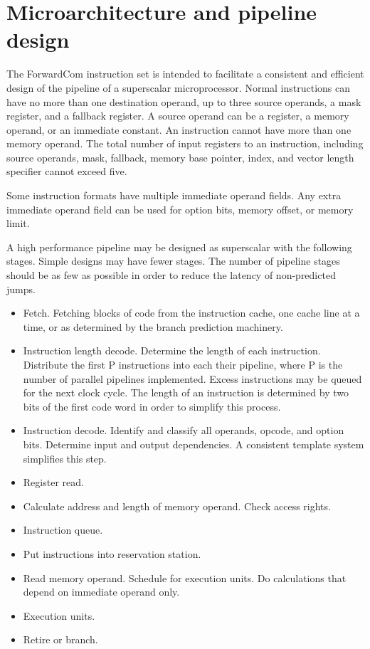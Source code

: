 \documentclass[forwardcom.tex]{subfiles}
\begin{document}
\RaggedRight

\chapter{Microarchitecture and pipeline design}
The ForwardCom instruction set is intended to facilitate a consistent and efficient design of the pipeline of a superscalar microprocessor. Normal instructions can have no more than one destination operand, up to three source operands, a mask register, and a fallback register. A source operand can be a register, a memory operand, or an immediate constant. An instruction cannot have more than one memory operand. The total number of input registers to an instruction, including source operands, mask, fallback, memory base pointer, index, and vector length specifier cannot exceed five.
\vv

Some instruction formats have multiple immediate operand fields. Any extra immediate operand field can be used for option bits, memory offset, or memory limit. 
\vv

A high performance pipeline may be designed as superscalar with the following stages. Simple designs may have fewer stages. The number of pipeline stages should be as few as possible in order to reduce the latency of non-predicted jumps.

\begin{itemize}
\item  Fetch. Fetching blocks of code from the instruction cache, one cache line at a time, or as determined by the branch prediction machinery. 

\item  Instruction length decode. Determine the length of each instruction. Distribute the first P instructions into each their pipeline, where P is the number of parallel pipelines implemented. Excess instructions may be queued for the next clock cycle. The length of an instruction is determined by two bits of the first code word in order to simplify this process.

\item  Instruction decode. Identify and classify all operands, opcode, and option bits. Determine input and output dependencies. A consistent template system simplifies this step.

\item  Register read.

\item  Calculate address and length of memory operand. Check access rights.

\item  Instruction queue. 

\item  Put instructions into reservation station.

\item  Read memory operand. Schedule for execution units. Do calculations that depend on immediate operand only.

\item  Execution units.  

\item  Retire or branch. 
\end{itemize}
\end{document}
